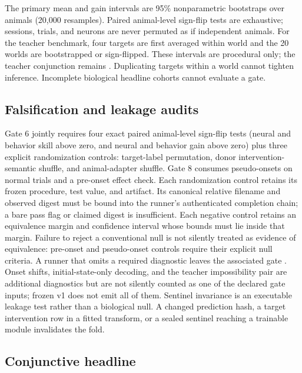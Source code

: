 \documentclass[11pt]{article}
\begin{document}
The primary mean and gain intervals are 95\% nonparametric bootstraps over
animals (20,000 resamples). Paired animal-level sign-flip tests are exhaustive;
sessions, trials, and neurons are never permuted as if independent animals.
For the teacher benchmark, four targets are first averaged within world and
the 20 worlds are bootstrapped or sign-flipped. These intervals are procedural
only; the teacher conjunction remains \NotEvaluated{}. Duplicating targets
within a world cannot tighten inference. Incomplete biological headline
cohorts cannot evaluate a gate.

\subsection{Falsification and leakage audits}

Gate 6 jointly requires four exact paired animal-level sign-flip tests
(neural and behavior skill above zero, and neural and behavior gain above
zero) plus three explicit randomization controls: target-label permutation,
donor intervention-semantic shuffle, and animal-adapter shuffle. Gate 8
consumes pseudo-onsets on normal trials and a pre-onset effect check.
Each randomization control retains its frozen procedure, test value, and
artifact. Its canonical relative filename and observed digest must be bound
into the runner's authenticated completion chain; a bare pass flag or claimed
digest is insufficient. Each negative control
retains an equivalence margin and confidence interval whose bounds must lie
inside that margin.
Failure to reject a conventional null is not silently treated as evidence of
equivalence: pre-onset and pseudo-onset controls require their explicit null
criteria. A runner that omits a required diagnostic leaves the associated gate
\NotEvaluated{}. Onset shifts, initial-state-only decoding, and the teacher
impossibility pair are additional diagnostics but are not silently counted as
one of the declared gate inputs; frozen v1 does not emit all of them. Sentinel
invariance is an executable leakage test rather than a biological null. A
changed prediction hash, a target intervention row in a
fitted transform, or a sealed sentinel reaching a trainable module invalidates
the fold.

\subsection{Conjunctive headline}


\end{document}
